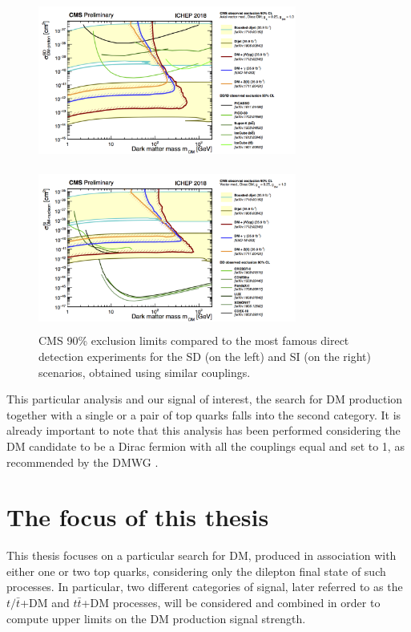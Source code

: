 \documentclass[a4paper, 10pt, openright]{report}
\begin{document}
\begin{figure}[htbp]
\centering
\begin{minipage}[b]{.47\textwidth}
\includegraphics[width=8.5cm, height=5.4cm]{figs/SDDD.png}
\end{minipage}\hfill
\begin{minipage}[b]{.47\textwidth}
\includegraphics[width=8.5cm, height=5.4cm]{figs/SIDD.png}
\end{minipage} \hfill
\caption{\ac{CMS} 90\% exclusion limits compared to the most famous direct detection experiments for the \ac{SD} (on the left) and \ac{SI} (on the right) scenarios, obtained using similar couplings.}
\label{fig:DDComparison}
\end{figure}

This particular analysis and our signal of interest, the search for \ac{DM} production together with a single or a pair of top quarks falls into the second category. It is already important to note that this analysis has been performed considering the \ac{DM} candidate to be a Dirac fermion with all the couplings equal and set to 1, as recommended by the \ac{DMWG} \cite{DMWG}.

\section{The focus of this thesis}\label{section:focus}

This thesis focuses on a particular search for \ac{DM}, produced in association with either one or two top quarks, considering only the dilepton final state of such processes. In particular, two different categories of signal, later referred to as the $t/\bar t$+DM and $t \bar t$+DM processes, will be considered and combined in order to compute upper limits on the \ac{DM} production signal strength. 
\end{document}
